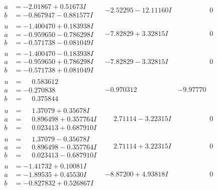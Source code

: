 \documentclass[1p]{elsarticle_modified}
\theoremstyle{definition}
\begin{document}
$$\begin{array}{c|c|c}
\begin{aligned}
a &= -2.01867 + 0.51673 I \\
b &= -0.867947 - 0.881577 I\end{aligned}
 & -2.52295 - 12.11160 I & \phantom{-0.000000 } 0 \\ \hline\begin{aligned}
u &= -1.400470 + 0.183938 I \\
a &= -0.959650 - 0.786298 I \\
b &= -0.571738 - 0.081049 I\end{aligned}
 & -7.82829 + 3.32815 I & \phantom{-0.000000 } 0 \\ \hline\begin{aligned}
u &= -1.400470 - 0.183938 I \\
a &= -0.959650 + 0.786298 I \\
b &= -0.571738 + 0.081049 I\end{aligned}
 & -7.82829 - 3.32815 I & \phantom{-0.000000 } 0 \\ \hline\begin{aligned}
u &= \phantom{-}0.583612\phantom{ +0.000000I} \\
a &= -0.270838\phantom{ +0.000000I} \\
b &= \phantom{-}0.375844\phantom{ +0.000000I}\end{aligned}
 & -0.970312\phantom{ +0.000000I} & -9.97770\phantom{ +0.000000I} \\ \hline\begin{aligned}
u &= \phantom{-}1.37079 + 0.35678 I \\
a &= \phantom{-}0.896498 + 0.357764 I \\
b &= \phantom{-}0.023413 + 0.687910 I\end{aligned}
 & \phantom{-}2.71114 - 3.22315 I & \phantom{-0.000000 } 0 \\ \hline\begin{aligned}
u &= \phantom{-}1.37079 - 0.35678 I \\
a &= \phantom{-}0.896498 - 0.357764 I \\
b &= \phantom{-}0.023413 - 0.687910 I\end{aligned}
 & \phantom{-}2.71114 + 3.22315 I & \phantom{-0.000000 } 0 \\ \hline\begin{aligned}
u &= -1.41732 + 0.10081 I \\
a &= -1.89535 + 0.45530 I \\
b &= -0.827832 + 0.526867 I\end{aligned}
 & -8.87200 + 4.93818 I & \phantom{-0.000000 } 0 \\ \hline\begin{aligned}

\end{aligned}
\end{array}$$
\end{document}
